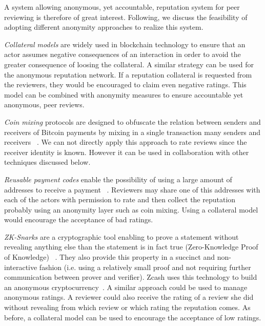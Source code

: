 A system allowing anonymous, yet accountable, reputation system for peer
reviewing is therefore of great interest. Following, we discuss the feasibility
of adopting different anonymity approaches to realize this system.

\emph{Collateral models} are widely used in blockchain technology to ensure that
an actor assumes negative consequences of an interaction in order to avoid the
greater consequence of loosing the collateral. A similar strategy can be used
for the anonymous reputation network. If a reputation collateral is requested
from the reviewers, they would be encouraged to claim even negative ratings.
This model can be combined with anonymity measures to ensure accountable yet
anonymous, peer reviews.

\emph{Coin mixing} protocols are designed to obfuscate the relation between
senders and receivers of Bitcoin payments by mixing in a single transaction many
senders and receivers ~\cite{meiklejohn2015privacy}. We can not directly apply
this approach to rate reviews since the receiver identity is known. However it
can be used in collaboration with other techniques discussed below.

\emph{Reusable payment codes} enable the possibility of using a large amount of
addresses to receive a payment ~\cite{harrigan2016unreasonable,
  ranvierReusable}. Reviewers may share one of this addresses with each of the
actors with permission to rate and then collect the reputation probably using an
anonymity layer such as coin mixing. Using a collateral model would encourage
the acceptance of bad ratings.

\emph{ZK-Snarks} are a cryptographic tool enabling to prove a statement without
revealing anything else than the statement is in fact true (Zero-Knowledge Proof
of Knowledge) ~\cite{blum1988non,bitansky2013succinct}. They also provide this
property in a succinct and non-interactive fashion (i.e. using a relatively
small proof and not requiring further communication between prover and
verifier). Zcash uses this technology to build an anonymous
cryptocurrency~\cite{sasson2014zerocash}. A similar approach could be used to
manage anonymous ratings. A reviewer could also receive the rating of a review
she did without revealing from which review or which rating the reputation
comes. As before, a collateral model can be used to encourage the acceptance of
low ratings.



